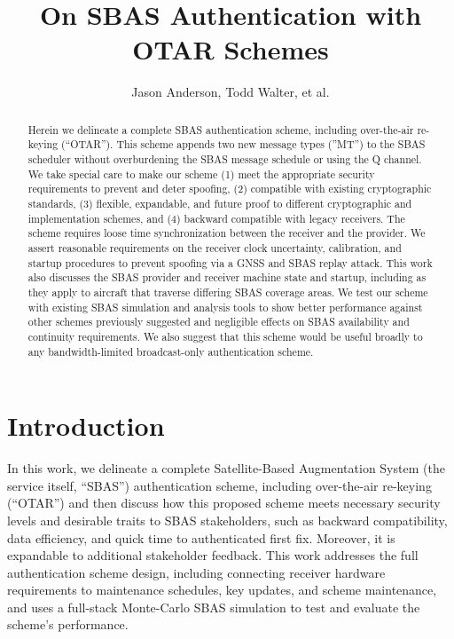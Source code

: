 \documentclass[letterpaper,times]{IONconf/IONconf}
\title{On SBAS Authentication with OTAR Schemes}
\author{Jason Anderson, Todd Walter, et al.}
\begin{document}
\maketitle

\begin{abstract}
Herein we delineate a complete SBAS authentication scheme, including over-the-air re-keying (``OTAR'').
This scheme appends two new message types (''MT'') to the SBAS scheduler without overburdening the SBAS message schedule or using the Q channel.
We take special care to make our scheme (1) meet the appropriate security requirements to prevent and deter spoofing, (2) compatible with existing cryptographic standards, (3) flexible, expandable, and future proof to different cryptographic and implementation schemes, and (4) backward compatible with legacy receivers.
The scheme requires loose time synchronization between the receiver and the provider.
We assert reasonable requirements on the receiver clock uncertainty, calibration, and startup procedures to prevent spoofing via a GNSS and SBAS replay attack.
This work also discusses the SBAS provider and receiver machine state and startup, including as they apply to aircraft that traverse differing SBAS coverage areas.
We test our scheme with existing SBAS simulation and analysis tools to show better performance against other schemes previously suggested and negligible effects on SBAS availability and continuity requirements.
We also suggest that this scheme would be useful broadly to any bandwidth-limited broadcast-only authentication scheme.
\end{abstract}

\section{Introduction}

In this work, we delineate a complete Satellite-Based Augmentation System (the service itself, ``SBAS'') authentication scheme, including over-the-air re-keying (``OTAR'') and then discuss how this proposed scheme meets necessary security levels and desirable traits to SBAS stakeholders, such as backward compatibility, data efficiency, and quick time to authenticated first fix.
Moreover, it is expandable to additional stakeholder feedback.
This work addresses the full authentication scheme design, including connecting receiver hardware requirements to maintenance schedules, key updates, and scheme maintenance, and uses a full-stack Monte-Carlo SBAS simulation to test and evaluate the scheme's performance.
\end{document}
